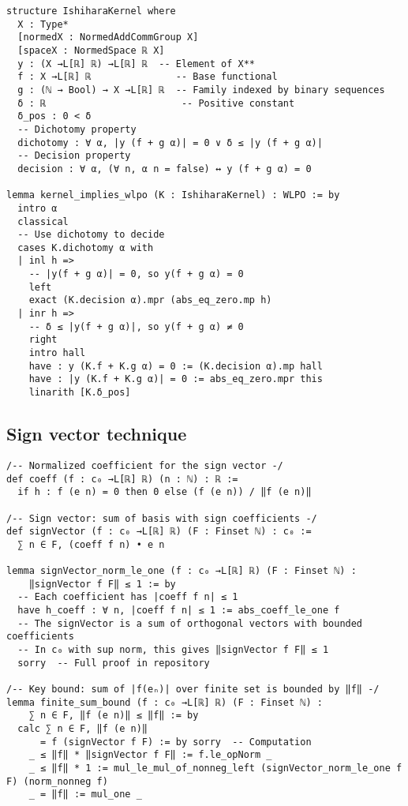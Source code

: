 \documentclass[11pt]{article}  %
\begin{document}
\begin{lstlisting}[caption={Ishihara kernel structure in Lean}]
structure IshiharaKernel where
  X : Type*
  [normedX : NormedAddCommGroup X]
  [spaceX : NormedSpace ℝ X]
  y : (X →L[ℝ] ℝ) →L[ℝ] ℝ  -- Element of X**
  f : X →L[ℝ] ℝ               -- Base functional
  g : (ℕ → Bool) → X →L[ℝ] ℝ  -- Family indexed by binary sequences
  δ : ℝ                        -- Positive constant
  δ_pos : 0 < δ
  -- Dichotomy property
  dichotomy : ∀ α, |y (f + g α)| = 0 ∨ δ ≤ |y (f + g α)|
  -- Decision property  
  decision : ∀ α, (∀ n, α n = false) ↔ y (f + g α) = 0

lemma kernel_implies_wlpo (K : IshiharaKernel) : WLPO := by
  intro α
  classical
  -- Use dichotomy to decide
  cases K.dichotomy α with
  | inl h => 
    -- |y(f + g α)| = 0, so y(f + g α) = 0
    left
    exact (K.decision α).mpr (abs_eq_zero.mp h)
  | inr h =>
    -- δ ≤ |y(f + g α)|, so y(f + g α) ≠ 0
    right
    intro hall
    have : y (K.f + K.g α) = 0 := (K.decision α).mp hall
    have : |y (K.f + K.g α)| = 0 := abs_eq_zero.mpr this
    linarith [K.δ_pos]
\end{lstlisting}

\subsection{Sign vector technique}

\begin{lstlisting}[caption={Sign vector construction for norm bounds}]
/-- Normalized coefficient for the sign vector -/
def coeff (f : c₀ →L[ℝ] ℝ) (n : ℕ) : ℝ :=
  if h : f (e n) = 0 then 0 else (f (e n)) / ‖f (e n)‖

/-- Sign vector: sum of basis with sign coefficients -/
def signVector (f : c₀ →L[ℝ] ℝ) (F : Finset ℕ) : c₀ :=
  ∑ n ∈ F, (coeff f n) • e n

lemma signVector_norm_le_one (f : c₀ →L[ℝ] ℝ) (F : Finset ℕ) :
    ‖signVector f F‖ ≤ 1 := by
  -- Each coefficient has |coeff f n| ≤ 1
  have h_coeff : ∀ n, |coeff f n| ≤ 1 := abs_coeff_le_one f
  -- The signVector is a sum of orthogonal vectors with bounded coefficients
  -- In c₀ with sup norm, this gives ‖signVector f F‖ ≤ 1
  sorry  -- Full proof in repository

/-- Key bound: sum of |f(eₙ)| over finite set is bounded by ‖f‖ -/
lemma finite_sum_bound (f : c₀ →L[ℝ] ℝ) (F : Finset ℕ) :
    ∑ n ∈ F, ‖f (e n)‖ ≤ ‖f‖ := by
  calc ∑ n ∈ F, ‖f (e n)‖ 
      = f (signVector f F) := by sorry  -- Computation
    _ ≤ ‖f‖ * ‖signVector f F‖ := f.le_opNorm _
    _ ≤ ‖f‖ * 1 := mul_le_mul_of_nonneg_left (signVector_norm_le_one f F) (norm_nonneg f)
    _ = ‖f‖ := mul_one _
\end{lstlisting}
\end{document}
